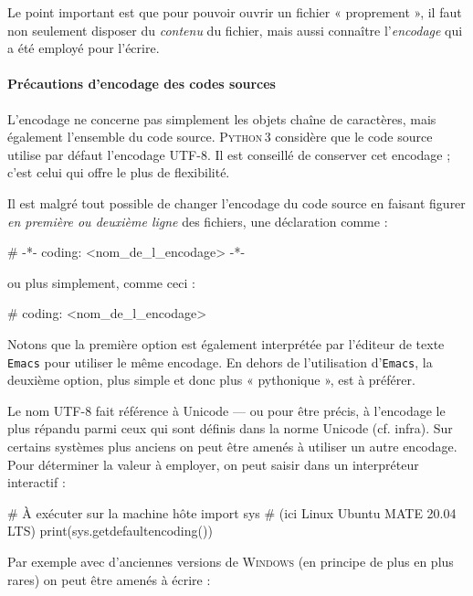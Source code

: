 Le point important est que pour pouvoir ouvrir un fichier « proprement », il faut non seulement disposer du \emph{contenu} du fichier, mais aussi connaître l'\emph{encodage} qui a été employé pour l'écrire.

\paragraph{Précautions d'encodage des codes sources} L'encodage ne concerne pas simplement les objets chaîne de caractères, mais également l'ensemble du code source. \textsc{Python\,3} considère que le code source utilise par défaut l'encodage UTF-8. Il est conseillé de conserver cet encodage ; c'est celui qui offre le plus de flexibilité.

Il est malgré tout possible de changer l'encodage du code source en faisant figurer \emph{en première ou deuxième ligne} des fichiers, une déclaration comme :

\begin{nbjupyterin}[before skip=4pt,after skip=6pt]{}
# -*- coding: <nom_de_l_encodage> -*-
\end{nbjupyterin}

\noindent ou plus simplement, comme ceci :

\begin{nbjupyterin}[before skip=4pt,after skip=6pt]{}
# coding: <nom_de_l_encodage>
\end{nbjupyterin}

Notons que la première option est également interprétée par l'éditeur de texte \texttt{Emacs} pour utiliser le même encodage. En dehors de l'utilisation d'\texttt{Emacs}, la deuxième option, plus simple et donc plus « pythonique », est à préférer.

Le nom UTF-8 fait référence à Unicode --- ou pour être précis, à l'encodage le plus répandu parmi ceux qui sont définis dans la norme Unicode (cf. infra). Sur certains systèmes plus anciens on peut être amenés à utiliser un autre encodage. Pour déterminer la valeur à employer, on peut saisir dans un interpréteur interactif :

\begin{idleconsole}
	\begin{pyconsole}
		# À exécuter sur la machine hôte
		import sys # (ici Linux Ubuntu MATE 20.04 LTS)
		print(sys.getdefaultencoding())
	\end{pyconsole}
\end{idleconsole}

Par exemple avec d'anciennes versions de \textsc{Windows} (en principe de plus en plus rares) on peut être amenés à écrire :

